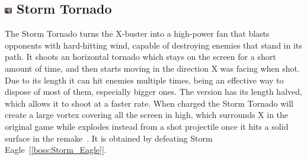 \subsection{\includegraphics[width=12px, height=10px]{figures/X1/weapons/Storm_T.jpg} Storm Tornado}\label{Storm_tornado}
The Storm Tornado turns the X-buster into a high-power fan that blasts opponents with hard-hitting wind, capable of destroying enemies that stand in its path. It shoots an horizontal tornado which stays on the screen for a short amount of time, and then starts moving in the direction X was facing when shot. Due to its length it can hit enemies multiple times, being an effective way to dispose of most of them, especially bigger ones.  The \mhx version has its length halved, which allows it to shoot at a faster rate. When charged the Storm Tornado will create a large vortex covering all the screen in high, which surrounds X in the original game while explodes instead from a shot projectile once it hits a solid surface in the remake~\cite{wiki:Storm_tornado}. It is obtained by defeating Storm Eagle~[\ref{boss:Storm_Eagle}].
